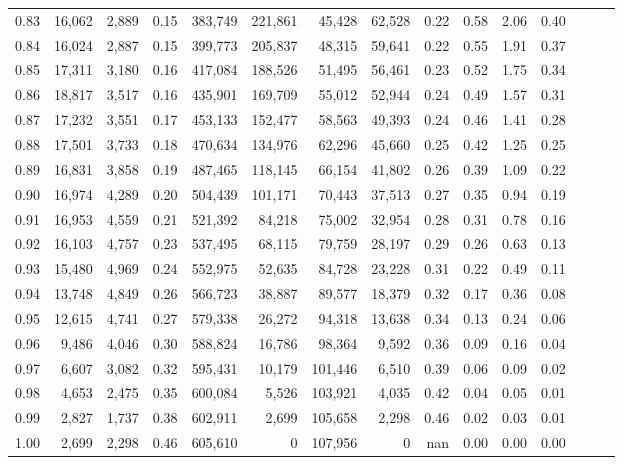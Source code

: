\begin{tabular}{rrrrrrrrrrrrrrr}
0.83 &  16,062 &  2,889 &  0.15 &  383,749 &  221,861 &   45,428 &   62,528 &  0.22 &  0.58 &  2.06 &      0.40 \\
0.84 &  16,024 &  2,887 &  0.15 &  399,773 &  205,837 &   48,315 &   59,641 &  0.22 &  0.55 &  1.91 &      0.37 \\
0.85 &  17,311 &  3,180 &  0.16 &  417,084 &  188,526 &   51,495 &   56,461 &  0.23 &  0.52 &  1.75 &      0.34 \\
0.86 &  18,817 &  3,517 &  0.16 &  435,901 &  169,709 &   55,012 &   52,944 &  0.24 &  0.49 &  1.57 &      0.31 \\
0.87 &  17,232 &  3,551 &  0.17 &  453,133 &  152,477 &   58,563 &   49,393 &  0.24 &  0.46 &  1.41 &      0.28 \\
0.88 &  17,501 &  3,733 &  0.18 &  470,634 &  134,976 &   62,296 &   45,660 &  0.25 &  0.42 &  1.25 &      0.25 \\
0.89 &  16,831 &  3,858 &  0.19 &  487,465 &  118,145 &   66,154 &   41,802 &  0.26 &  0.39 &  1.09 &      0.22 \\
0.90 &  16,974 &  4,289 &  0.20 &  504,439 &  101,171 &   70,443 &   37,513 &  0.27 &  0.35 &  0.94 &      0.19 \\
0.91 &  16,953 &  4,559 &  0.21 &  521,392 &   84,218 &   75,002 &   32,954 &  0.28 &  0.31 &  0.78 &      0.16 \\
0.92 &  16,103 &  4,757 &  0.23 &  537,495 &   68,115 &   79,759 &   28,197 &  0.29 &  0.26 &  0.63 &      0.13 \\
0.93 &  15,480 &  4,969 &  0.24 &  552,975 &   52,635 &   84,728 &   23,228 &  0.31 &  0.22 &  0.49 &      0.11 \\
0.94 &  13,748 &  4,849 &  0.26 &  566,723 &   38,887 &   89,577 &   18,379 &  0.32 &  0.17 &  0.36 &      0.08 \\
0.95 &  12,615 &  4,741 &  0.27 &  579,338 &   26,272 &   94,318 &   13,638 &  0.34 &  0.13 &  0.24 &      0.06 \\
0.96 &   9,486 &  4,046 &  0.30 &  588,824 &   16,786 &   98,364 &    9,592 &  0.36 &  0.09 &  0.16 &      0.04 \\
0.97 &   6,607 &  3,082 &  0.32 &  595,431 &   10,179 &  101,446 &    6,510 &  0.39 &  0.06 &  0.09 &      0.02 \\
0.98 &   4,653 &  2,475 &  0.35 &  600,084 &    5,526 &  103,921 &    4,035 &  0.42 &  0.04 &  0.05 &      0.01 \\
0.99 &   2,827 &  1,737 &  0.38 &  602,911 &    2,699 &  105,658 &    2,298 &  0.46 &  0.02 &  0.03 &      0.01 \\
1.00 &   2,699 &  2,298 &  0.46 &  605,610 &        0 &  107,956 &        0 &   nan &  0.00 &  0.00 &      0.00 \\
\bottomrule
\end{tabular}
